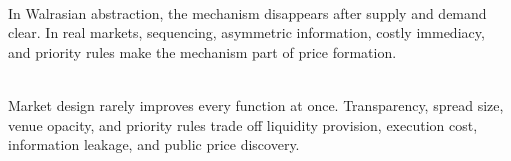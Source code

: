 \documentclass[a4paper,oneside,openany]{book}
\begin{document}
\begin{principle} \\
In Walrasian abstraction, the mechanism disappears after supply and demand clear. In real markets, sequencing, asymmetric information, costly immediacy, and priority rules make the mechanism part of price formation.
\end{principle}

\begin{caveat} \\
Market design rarely improves every function at once. Transparency, spread size, venue opacity, and priority rules trade off liquidity provision, execution cost, information leakage, and public price discovery.
\end{caveat}
\end{document}
